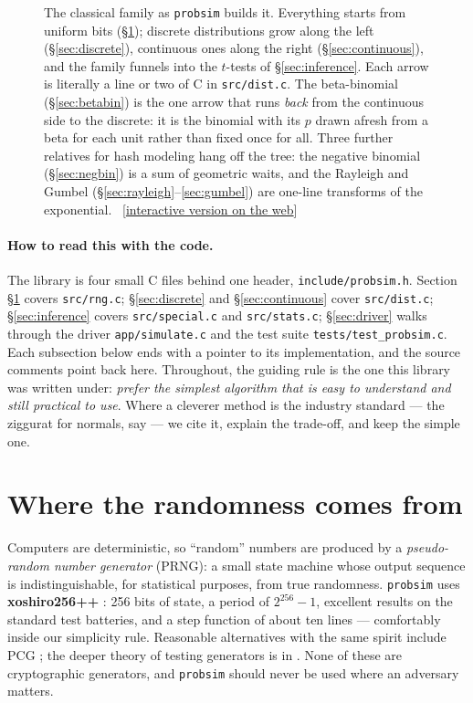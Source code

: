 \documentclass[11pt]{article}
\numberwithin{equation}{section}
\newcommand{\siteurl}{https://sanya-shopper.github.io/distribs/}
\newcommand{\webfig}[1]{{\small\sffamily\color{inkS}%
  [\href{\siteurl\##1}{interactive version on the web}]}}
\begin{document}
\begin{figure}[htbp]
\caption{The classical family as \texttt{probsim} builds it.  Everything
starts from uniform bits (\S\ref{sec:rng}); \textcolor{sGreen}{discrete}
distributions grow along the left (\S\ref{sec:discrete}),
\textcolor{sBlue}{continuous} ones along the right (\S\ref{sec:continuous}),
and the family funnels into the \textcolor{cRed}{$t$-tests} of
\S\ref{sec:inference}.  Each arrow is literally a line or two of C in
\texttt{src/dist.c}.  The beta-binomial (\S\ref{sec:betabin}) is the one
arrow that runs \emph{back} from the continuous side to the discrete: it
is the binomial with its $p$ drawn afresh from a beta for each unit
rather than fixed once for all.  Three further relatives for hash
modeling hang off the tree: the negative binomial (\S\ref{sec:negbin})
is a sum of geometric waits, and the Rayleigh and Gumbel
(\S\ref{sec:rayleigh}--\ref{sec:gumbel}) are one-line transforms of the
exponential.\ \webfig{family}}
\label{fig:family}
\end{figure}

\paragraph{How to read this with the code.}
The library is four small C files behind one header,
\texttt{include/probsim.h}.  Section \S\ref{sec:rng} covers
\texttt{src/rng.c}; \S\ref{sec:discrete} and \S\ref{sec:continuous} cover
\texttt{src/dist.c}; \S\ref{sec:inference} covers \texttt{src/special.c}
and \texttt{src/stats.c}; \S\ref{sec:driver} walks through the driver
\texttt{app/simulate.c} and the test suite \texttt{tests/test\_probsim.c}.
Each subsection below ends with a pointer to its implementation, and the
source comments point back here.  Throughout, the guiding rule is the one
this library was written under: \emph{prefer the simplest algorithm that is
easy to understand and still practical to use}.  Where a cleverer method is
the industry standard --- the ziggurat for normals, say
\citep{marsaglia2000ziggurat} --- we cite it, explain the trade-off, and
keep the simple one.

\section{Where the randomness comes from}\label{sec:rng}

Computers are deterministic, so ``random'' numbers are produced by a
\emph{pseudo-random number generator} (PRNG): a small state machine whose
output sequence is indistinguishable, for statistical purposes, from true
randomness.  \texttt{probsim} uses \textbf{xoshiro256++}
\citep{blackman2021xoshiro}: 256 bits of state, a period of $2^{256}-1$,
excellent results on the standard test batteries, and a step function of
about ten lines --- comfortably inside our simplicity rule.  Reasonable
alternatives with the same spirit include PCG \citep{oneill2014pcg}; the
deeper theory of testing generators is in \citet[ch.~3]{knuth1997}.  None
of these are cryptographic generators, and \texttt{probsim} should never be
used where an adversary matters.
\end{document}
